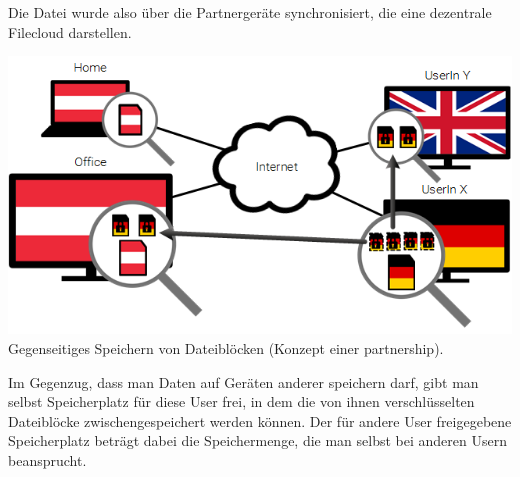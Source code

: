Die Datei wurde also über die Partnergeräte synchronisiert, die eine dezentrale
Filecloud darstellen.

\includegraphics[]{images/sblit_3}
Gegenseitiges Speichern von Dateiblöcken (Konzept einer \gls{partnership}).

Im Gegenzug, dass man Daten auf Geräten anderer speichern darf, gibt man selbst
Speicherplatz für diese User frei, in dem die von ihnen verschlüsselten
Dateiblöcke zwischengespeichert werden können. Der für andere User freigegebene
Speicherplatz beträgt dabei die Speichermenge, die man selbst bei anderen Usern
beansprucht.
